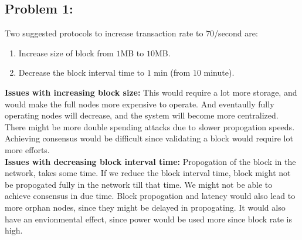 \documentclass[a4paper]{article}
\begin{document}
\subsection*{Problem 1:}
Two suggested protocols to increase transaction rate to $70$/second are:
\begin{enumerate}
    \item Increase size of block from $1$MB to $10$MB.
    \item Decrease the block interval time to $1$ min (from $10$ minute).
\end{enumerate}
\textbf{Issues with increasing block size:} This would require a lot more storage, and would make the full
            nodes more expensive to operate. And eventaully fully operating nodes will decrease, and the system
            will become more centralized. There might be more double spending attacks due to slower propogation
            speeds. Achieving consensus would be difficult since validating a block would require lot more efforts. \\

\textbf{Issues with decreasing block interval time:} Propogation of the block in the network, takes some time. 
            If we reduce the block interval time, block might not be propogated fully in the network till that time.
            We might not be able to achieve consensus in due time. Block propogation and latency would also lead to more
            orphan nodes, since they might be delayed in propogating. It would also have an envionmental effect, since
            power would be used more since block rate is high.
\end{document}
